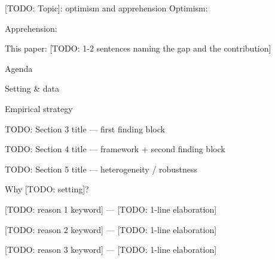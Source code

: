 \documentclass[aspectratio=169,t,11pt,table]{beamer}
\begin{document}
\begin{frame}{[TODO: Topic]: optimism and apprehension}
  \textcolor{trueblue}{Optimism:}
  \bi
    \item<1-> [TODO: claim 1] 
    \item<1-> [TODO: claim 2] 
  \ei
  \pause
  \medskip
  \textcolor{raspberry}{Apprehension:}
  \bi
    \item<2-> [TODO: counter-claim 1] 
    \item<2-> [TODO: counter-claim 2] 
  \ei
  \pause
  \bigskip
  \alert{This paper:} [TODO: 1-2 sentences naming the gap and the contribution]
\end{frame}

\begin{frame}{Agenda}
  \be
    \item Setting \& data
    \item Empirical strategy
    \item [TODO: Section 3 title — first finding block]
    \item [TODO: Section 4 title — framework + second finding block]
    \item [TODO: Section 5 title — heterogeneity / robustness]
  \ee
\end{frame}

\begin{frame}{Why [TODO: setting]?}
  \bi
    \item<1-> \alert{[TODO: reason 1 keyword]} — [TODO: 1-line elaboration]
    \item<2-> \alert{[TODO: reason 2 keyword]} — [TODO: 1-line elaboration]
    \item<3-> \alert{[TODO: reason 3 keyword]} — [TODO: 1-line elaboration]
  \ei
\end{frame}
\end{document}
